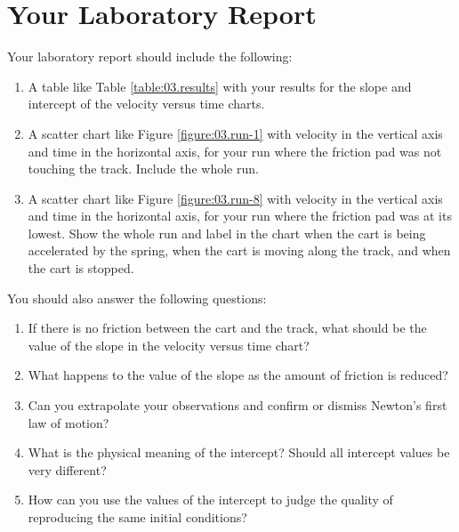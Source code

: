 \section{Your Laboratory Report}
%
Your laboratory report should include the following:
\begin{enumerate}
    \item A table like Table \ref{table:03.results} with your results for the slope and intercept of the velocity versus time charts.
    \item A scatter chart like Figure \ref{figure:03.run-1} with velocity in the vertical axis and time in the horizontal axis, for your run where the friction pad was not touching the track. Include the whole run.
    \item A scatter chart like Figure \ref{figure:03.run-8} with velocity in the vertical axis and time in the horizontal axis, for your run where the friction pad was at its lowest. Show the whole run and label in the chart when the cart is being accelerated by the spring, when the cart is moving along the track, and when the cart is stopped.
\end{enumerate}
You should also answer the following questions:
\begin{enumerate}
    \item If there is no friction between the cart and the track, what should be the value of the slope in the velocity versus time chart?
    \item What happens to the value of the slope as the amount of friction is reduced?
    \item Can you extrapolate your observations and confirm or dismiss Newton's first law of motion?
    \item What is the physical meaning of the intercept? Should all intercept values be very different?
    \item How can you use the values of the intercept to judge the quality of reproducing the same initial conditions?
\end{enumerate}
%
\newpage
